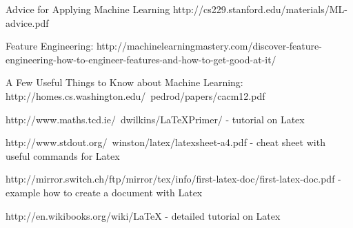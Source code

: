 \documentclass{article} %
\begin{document}
Advice for Applying Machine Learning http://cs229.stanford.edu/materials/ML-advice.pdf

Feature Engineering: http://machinelearningmastery.com/discover-feature-engineering-how-to-engineer-features-and-how-to-get-good-at-it/

A Few Useful Things to Know about Machine Learning: http://homes.cs.washington.edu/~pedrod/papers/cacm12.pdf

http://www.maths.tcd.ie/~dwilkins/LaTeXPrimer/ - tutorial on Latex

http://www.stdout.org/~winston/latex/latexsheet-a4.pdf - cheat sheet with useful commands for Latex

http://mirror.switch.ch/ftp/mirror/tex/info/first-latex-doc/first-latex-doc.pdf - example how to create a document with Latex

http://en.wikibooks.org/wiki/LaTeX - detailed tutorial on Latex
\end{document}
